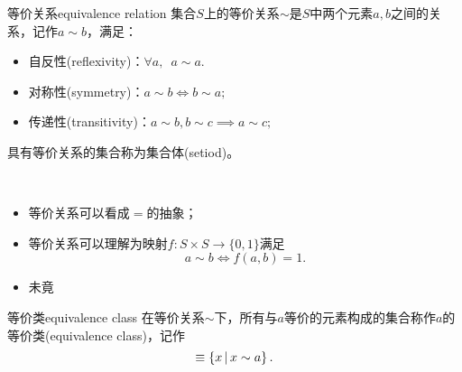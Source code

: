 \begin{definition}{等价关系}{equivalence relation}
	集合$S$上的等价关系$\sim$是$S$中两个元素$a,b$之间的关系，记作$a\sim b$，满足：
	\begin{itemize}
		\item 自反性(reflexivity)：$\forall a,\enspace a\sim a.$
		\item 对称性(symmetry)：$a\sim b\iff b\sim a;$
		\item 传递性(transitivity)：$a\sim b,b\sim c\implies a\sim c;$
	\end{itemize}
	具有等价关系的集合称为集合体(setiod)。
\end{definition}
\begin{remark}~
	\begin{itemize}
		\item 等价关系可以看成$=$的抽象；
		\item 等价关系可以理解为映射$f:S\times S\to\{0,1\}$满足 
		\[
			a\sim b\iff f(a,b)=1.
		\]
		\item 未竟
	\end{itemize}
\end{remark}

\begin{definition}
	{等价类}{equivalence class}
	在等价关系$\sim$下，所有与$a$等价的元素构成的集合称作$a$的等价类(equivalence class)，记作 
	\begin{equation}
		[a]\equiv\set x{x\sim a}.
	\end{equation}
\end{definition}


